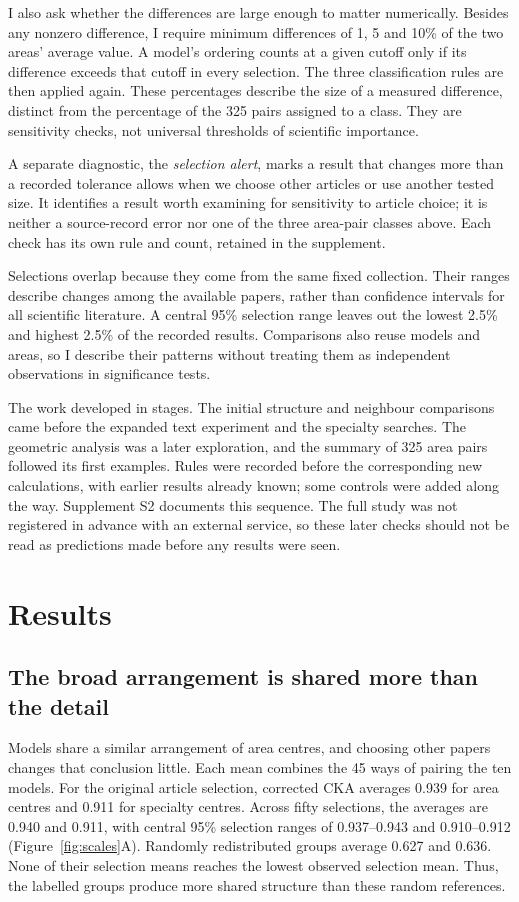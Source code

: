 \documentclass[12pt]{article}
\begin{document}
I also ask whether the differences are large enough to matter numerically. Besides any nonzero difference, I require minimum differences of 1, 5 and 10\% of the two areas' average value. A model's ordering counts at a given cutoff only if its difference exceeds that cutoff in every selection. The three classification rules are then applied again. These percentages describe the size of a measured difference, distinct from the percentage of the 325 pairs assigned to a class. They are sensitivity checks, not universal thresholds of scientific importance.

A separate diagnostic, the \emph{selection alert}, marks a result that changes more than a recorded tolerance allows when we choose other articles or use another tested size. It identifies a result worth examining for sensitivity to article choice; it is neither a source-record error nor one of the three area-pair classes above. Each check has its own rule and count, retained in the supplement.

Selections overlap because they come from the same fixed collection. Their ranges describe changes among the available papers, rather than confidence intervals for all scientific literature. A central 95\% selection range leaves out the lowest 2.5\% and highest 2.5\% of the recorded results. Comparisons also reuse models and areas, so I describe their patterns without treating them as independent observations in significance tests.

The work developed in stages. The initial structure and neighbour comparisons came before the expanded text experiment and the specialty searches. The geometric analysis was a later exploration, and the summary of 325 area pairs followed its first examples. Rules were recorded before the corresponding new calculations, with earlier results already known; some controls were added along the way. Supplement S2 documents this sequence. The full study was not registered in advance with an external service, so these later checks should not be read as predictions made before any results were seen.

\section{Results}
\FloatBarrier
\subsection{The broad arrangement is shared more than the detail}
Models share a similar arrangement of area centres, and choosing other papers changes that conclusion little. Each mean combines the 45 ways of pairing the ten models. For the original article selection, corrected CKA averages 0.939 for area centres and 0.911 for specialty centres. Across fifty selections, the averages are 0.940 and 0.911, with central 95\% selection ranges of 0.937--0.943 and 0.910--0.912 (Figure~\ref{fig:scales}A). Randomly redistributed groups average 0.627 and 0.636. None of their selection means reaches the lowest observed selection mean. Thus, the labelled groups produce more shared structure than these random references.
\end{document}
